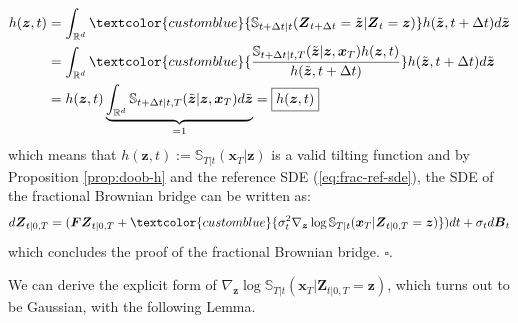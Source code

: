 \documentclass{article}
\newcommand{\bluetext}[1]{\textcolor{customblue}{#1}}
\begin{document}
\begin{align}
    h(\boldsymbol{z},t)&=\int_{\mathbb{R}^d}\bluetext{\mathbb{S}_{t+\Delta t|t}(\boldsymbol{Z}_{t+\Delta t}=\tilde{\boldsymbol{z}}|\boldsymbol{Z}_t=\boldsymbol{z})}h(\tilde{\boldsymbol{z}},t+\Delta t)d\tilde{\boldsymbol{z}}\nonumber\\
    &=\int_{\mathbb{R}^d}\bluetext{\frac{\mathbb{S}_{t+\Delta t|t, T}(\tilde{\boldsymbol{z}}|\boldsymbol{z}, \boldsymbol{x}_T)h(\boldsymbol{z},t)}{h(\tilde{\boldsymbol{z}},t+\Delta t)}}h(\tilde{\boldsymbol{z}},t+\Delta t)d\tilde{\boldsymbol{z}}\nonumber\\
    &=h(\boldsymbol{z},t)\underbrace{\int_{\mathbb{R}^d}\mathbb{S}_{t+\Delta t|t, T}(\tilde{\boldsymbol{z}}|\boldsymbol{z}, \boldsymbol{x}_T)d\tilde{\boldsymbol{z}}}_{=1}=\boxed{h(\boldsymbol{z},t)}
\end{align}
which means that $h(\boldsymbol{z},t):=\mathbb{S}_{T|t}(\boldsymbol{x}_T|\boldsymbol{z})$ is a valid tilting function and by Proposition \ref{prop:doob-h} and the reference SDE (\ref{eq:frac-ref-sde}), the SDE of the fractional Brownian bridge can be written as:
\begin{align}
    d\boldsymbol{Z}_{t|0,T}=(\boldsymbol{F}\boldsymbol{Z}_{t|0,T}+\bluetext{\sigma_t^2\nabla_{\boldsymbol{z}} \log \mathbb{S}_{T|t}(\boldsymbol{x}_T|\boldsymbol{Z}_{t|0,T}=\boldsymbol{z})})dt+\sigma_td\boldsymbol{B}_t\label{eq:frac-brownian-bridge}
\end{align}
which concludes the proof of the fractional Brownian bridge. \hfill $\square$.

We can derive the explicit form of $\nabla_{\boldsymbol{z}} \log \mathbb{S}_{T|t}(\boldsymbol{x}_T|\boldsymbol{Z}_{t|0,T}=\boldsymbol{z})$, which turns out to be Gaussian, with the following Lemma.
\end{document}
